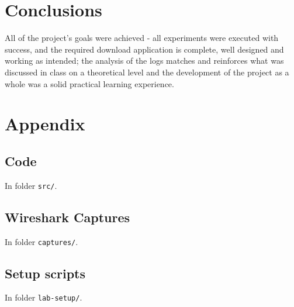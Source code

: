 \documentclass[11pt,a4paper,twocolumn]{article}
\begin{document}
\section{Conclusions}

All of the project's goals were achieved - all experiments were executed with success, and the required download application is complete, well designed and working as intended; the analysis of the logs matches and reinforces what was discussed in class on a theoretical level and the development of the project as a whole was a solid practical learning experience.

\onecolumn
\appendix
\section{Appendix}

\subsection{Code}

\noindent In folder \lstinline{src/}.

\subsection{Wireshark Captures}

\noindent In folder \lstinline{captures/}.

\subsection{Setup scripts}

\noindent In folder \lstinline{lab-setup/}.
\end{document}
